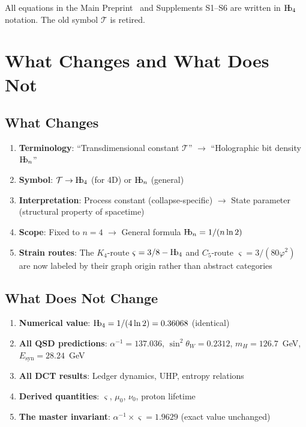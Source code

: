 \documentclass[11pt,a4paper]{article}
\theoremstyle{plain}
\theoremstyle{definition}
\newcommand{\Hb}{\textnormal{H\kern-0.3em b}}
\newcommand{\Hbn}{\Hb_n}
\newcommand{\Hbfour}{\Hb_4}
\newcommand{\Tc}{\mathcal{T}}
\newcommand{\strain}{\varsigma}
\newcommand{\murad}{\mu_0}
\newcommand{\nurad}{\nu_0}
\newcommand{\mH}{m_H}
\newcommand{\Esyn}{E_{\text{syn}}}
\begin{document}
All equations in the Main Preprint~\cite{Hubka2026QSD} and Supplements S1--S6 are written in $\Hbfour$ notation. The old symbol $\Tc$ is retired.

\section{What Changes and What Does Not}
\label{sec:changes}

\subsection{What Changes}

\begin{enumerate}
    \item \textbf{Terminology}: ``Transdimensional constant $\Tc$'' $\to$ ``Holographic bit density $\Hbn$''
    
    \item \textbf{Symbol}: $\Tc \to \Hbfour$ (for 4D) or $\Hbn$ (general)
    
    \item \textbf{Interpretation}: Process constant (collapse-specific) $\to$ State parameter (structural property of spacetime)
    
    \item \textbf{Scope}: Fixed to $n=4$ $\to$ General formula $\Hbn = 1/(n\ln 2)$
    
    \item \textbf{Strain routes}: The $K_4$-route $\strain = 3/8 - \Hbfour$ and $C_5$-route $\strain = 3/(80\varphi^2)$ are now labeled by their graph origin rather than abstract categories
\end{enumerate}

\subsection{What Does Not Change}

\begin{enumerate}
    \item \textbf{Numerical value}: $\Hbfour = 1/(4\ln 2) = 0.36068$ (identical)
    
    \item \textbf{All QSD predictions}: $\alpha^{-1} = 137.036$, $\sin^2\theta_W = 0.2312$, $\mH = 126.7$~GeV, $\Esyn = 28.24$~GeV
    
    \item \textbf{All DCT results}: Ledger dynamics, UHP, entropy relations
    
    \item \textbf{Derived quantities}: $\strain$, $\murad$, $\nurad$, proton lifetime
    
    \item \textbf{The master invariant}: $\alpha^{-1} \times \strain = 1.9629$ (exact value unchanged)
\end{enumerate}
\end{document}
